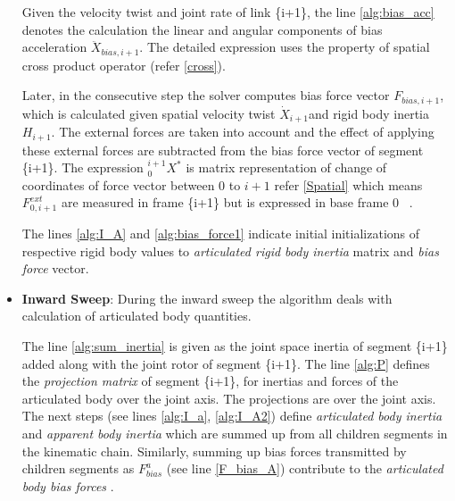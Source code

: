 \begin{itemize}
Given the velocity twist and joint rate of link \{i+1\}, the line \ref{alg:bias_acc} denotes the calculation the linear and angular components of bias acceleration $\ddot{X}_{bias,i+1}$. The detailed expression uses the property of spatial cross product operator (refer \ref{cross}).


Later, in the consecutive step the solver computes bias force vector $F_{bias,i+1}$, which is calculated given spatial velocity twist $\dot{X}_{i+1}$and rigid body inertia $H_{i+1}$. The external forces are taken into account and the effect of applying these external forces are subtracted from the bias force vector of segment \{i+1\}. The expression ${}^{i+1}_{0}X^*$ is matrix representation of change of coordinates of force vector between ${0}$ to ${i+1}$ refer \ref{Spatial} \cite{vukcevic2018extending} which means $F^{ext}_{0,i+1}$ are measured in frame \{i+1\} but is expressed in base frame {0} ~\cite{shakhimardanov2015composable}.

%		
The lines \ref{alg:I_A} and \ref{alg:bias_force1} indicate initial initializations of respective rigid body values to \textit{articulated rigid body inertia} matrix and \textit{bias force} vector.

\item \textbf{Inward Sweep}: During the inward sweep the algorithm deals with calculation of articulated body quantities. 


The line \ref{alg:sum_inertia} is given as the joint space inertia of segment \{i+1\} added along with the joint rotor of segment \{i+1\}. The line \ref{alg:P} defines the \textit{projection matrix} of segment \{i+1\}, for inertias and forces of the articulated body over the joint axis. The projections are over the joint axis. The next steps (see lines \ref{alg:I_a}, \ref{alg:I_A2}) define \textit{articulated body inertia} and \textit{apparent body inertia} which are summed up from all children segments in the kinematic chain. Similarly, summing up bias forces transmitted by children segments as $F_{bias}^{a}$ (see line \ref{F_bias_A}) contribute to the \textit{articulated body bias forces} \cite{vukcevic2018extending}.



\end{itemize}
